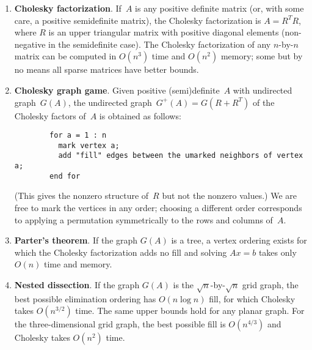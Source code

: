 \documentclass[11pt]{article}
\begin{document}
\begin{enumerate}
\item\label{Cholesky}{\bf Cholesky factorization}.
If~$A$ is any positive definite matrix 
(or, with some care, a positive semidefinite matrix),
the Cholesky factorization is $A=R^TR$, where $R$
is an upper triangular matrix with positive diagonal elements
(non-negative in the semidefinite case).
The Cholesky factorization of any $n$-by-$n$ matrix can
be computed in $O(n^3)$ time and $O(n^2)$ memory;
some but by no means all sparse matrices have better
bounds.

\item{\bf Cholesky graph game}.
Given positive (semi)definite~$A$ with undirected graph~$G(A)$,
the undirected graph~$G^+(A)=G(R+R^T)$ of the Cholesky factors
of~$A$ is obtained as follows:
\begin{verbatim}
        for a = 1 : n
          mark vertex a;
          add "fill" edges between the umarked neighbors of vertex a;
        end for
\end{verbatim}
(This gives the nonzero structure of~$R$ but not the nonzero values.)
We are free to mark the vertices in any order;
choosing a different order corresponds to applying a
permutation symmetrically to the rows and columns of~$A$.

\item{\bf Parter's theorem}.
If the graph $G(A)$ is a tree, a vertex ordering exists for
which the Cholesky factorization adds no fill and solving
$Ax=b$ takes only $O(n)$ time and memory.

\item{\bf Nested dissection}.
If the graph $G(A)$ is the $\sqrt{n}$-by-$\sqrt{n}$ grid graph,
the best possible elimination ordering has $O(n\log n)$ fill,
for which Cholesky takes $O(n^{3/2})$ time.
The same upper bounds hold for any planar graph.
For the three-dimensional grid graph, the best possible
fill is $O(n^{4/3})$ and Cholesky takes $O(n^2)$ time.

\end{enumerate}
\end{document}
